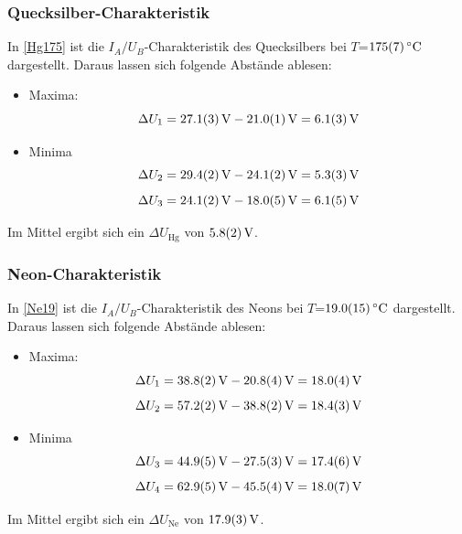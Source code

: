 \documentclass[
	a4paper,
	12pt,
	pagesize,
	ngerman
]{scrartcl}
\begin{document}
	\subsubsection{Quecksilber-Charakteristik}
	In \cref{Hg175} ist die $I_A/U_B$-Charakteristik des Quecksilbers bei $T$=$\SI{175 +- 7}{\degreeCelsius}$ dargestellt. Daraus lassen sich folgende Abstände ablesen:
	\begin{itemize}
		\item Maxima:
		\begin{equation*}
			\Delta{U}_1 = \SI{27,1 +- 0,3}{V} -\SI{21 +- 0,1}{V} = \SI{6,1 +- 0,3}{V}
		\end{equation*}
		\item Minima
		\begin{equation*}\Delta{U}_2 = \SI{29,4 +- 0,2}{V} -\SI{24,1 +- 0,2}{V} = \SI{5,3 +- 0,3}{V}\end{equation*}
		\begin{equation*}\Delta{U}_3 = \SI{24,1 +- 0,2}{V}- \SI{18,0 +- 0,5}{V} = \SI{6,1 +- 0,5}{V}\end{equation*}
	\end{itemize}
	Im Mittel ergibt sich ein $\Delta{U_\text{Hg}}$ von $\SI{5,8 +- 0,2}{V}$.
	


	\subsubsection{Neon-Charakteristik}
	In \cref{Ne19} ist die $I_A/U_B$-Charakteristik des Neons bei $T$=$\SI{19 +- 1,5}{\degreeCelsius}$ dargestellt. Daraus lassen sich folgende Abstände ablesen:
	\begin{itemize}
		\item Maxima:
		\begin{equation*}
		\Delta{U}_1 = \SI{38,8 +- 0,2}{V} -\SI{20,8 +- 0,4}{V} = \SI{18,0+- 0,4}{V}
		\end{equation*}
		\begin{equation*}
		\Delta{U}_2 = \SI{57,2 +- 0,2}{V} - \SI{38,8 +- 0,2}{V} = \SI{18,4 +- 0,3}{V}
		\end{equation*}
		\item Minima
		\begin{equation*}\Delta{U}_3 = \SI{44,9 +- 0,5}{V} -\SI{27,5 +- 0,3}{V} = \SI{17,4 +- 0,6}{V}\end{equation*}
		\begin{equation*}\Delta{U}_4 = \SI{62,9 +- 0,5}{V}- \SI{45,5 +- 0,4}{V} = \SI{18,0 +- 0,7}{V}\end{equation*}
	\end{itemize}
	Im Mittel ergibt sich ein $\Delta{U_\text{Ne}}$ von $\SI{17,9 +- 0,3}{V}$.
\end{document}
